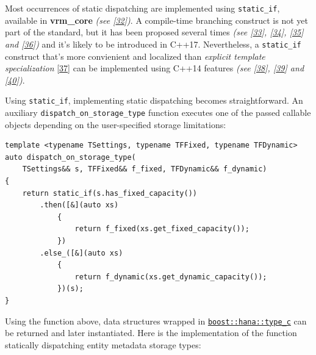 \documentclass[twoside, 12pt, a4paper, openany]{book}
\begin{document}
Most occurrences of static dispatching are implemented using
\texttt{static_if},
available in \textbf{vrm\_core} \emph{(see
{[}\protect\hyperlink{ref-github_vrmcore}{32}{]})}. A compile-time
branching construct is not yet part of the standard, but it has been
proposed several times \emph{(see
{[}\protect\hyperlink{ref-isocpp_sif0}{33}{]},
{[}\protect\hyperlink{ref-isocpp_sif1}{34}{]},
{[}\protect\hyperlink{ref-isocpp_sif2}{35}{]} and
{[}\protect\hyperlink{ref-isocpp_sif3}{36}{]})} and it's likely to be
introduced in C++17. Nevertheless, a
\texttt{static_if}
construct that's more convienient and localized than \emph{explicit
template specialization}
{[}\protect\hyperlink{ref-cppreference_ets}{37}{]} can be implemented
using C++14 features \emph{(see {[}\protect\hyperlink{ref-sif0}{38}{]},
{[}\protect\hyperlink{ref-sif1}{39}{]} and
{[}\protect\hyperlink{ref-sif2}{40}{]})}.

Using
\texttt{static_if},
implementing static dispatching becomes straightforward. An auxiliary
\texttt{dispatch_on_storage_type}
function executes one of the passed callable objects depending on the
user-specified storage limitations:

\begin{verbatim}
template <typename TSettings, typename TFFixed, typename TFDynamic>
auto dispatch_on_storage_type(
    TSettings&& s, TFFixed&& f_fixed, TFDynamic&& f_dynamic)
{
    return static_if(s.has_fixed_capacity())
        .then([&](auto xs)
            {
                return f_fixed(xs.get_fixed_capacity());
            })
        .else_([&](auto xs)
            {
                return f_dynamic(xs.get_dynamic_capacity());
            })(s);
}
\end{verbatim}

Using the function above, data structures wrapped in
\href{http://www.boost.org/doc/libs/1_61_0/libs/hana/doc/html/structboost_1_1hana_1_1type.html\#ae35139e732c4b75e91061513cf445628}{\texttt{boost::hana::type_c}}
can be returned and later instantiated. Here is the implementation of
the function statically dispatching entity metadata storage types:
\end{document}
